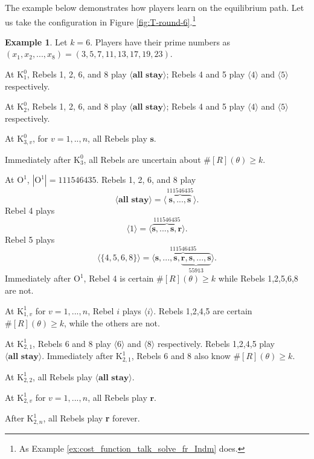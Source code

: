 \documentclass[12pt,letter]{article}
\newcommand{\Kappa}{\mathrm{K}}
\newcommand{\Omicron}{\mathrm{O}}
\theoremstyle{definition}
\newtheorem{example}{Example}
\theoremstyle{remark}
\theoremstyle{claim}
\begin{document}
The example below demonstrates how players learn on the equilibrium path. Let us take the configuration in Figure \ref{fig:T-round-6}.\footnote{As Example \ref{ex:cost_function_talk_solve_fr_Indm} does.}
\begin{example}
Let $k=6$. Players have their prime numbers as $(x_1,x_2,...,x_8)=(3,5,7,11,13,17,19,23)$.

At $\Kappa^0_{1}$, Rebels 1, 2, 6, and 8 play $\langle \textbf{all stay} \rangle$; Rebels 4 and 5 play $\langle 4 \rangle$ and $\langle 5 \rangle$ respectively. 

At $\Kappa^0_{2}$, Rebels 1, 2, 6, and 8 play $\langle \textbf{all stay} \rangle$; Rebels 4 and 5 play $\langle 4 \rangle$ and $\langle 5 \rangle$ respectively.

At $\Kappa^0_{3,v}$, for $v=1,..,n$, all Rebels play $\textbf{s} $. 

Immediately after $\Kappa^0_{3}$, all Rebels are uncertain about $\# [R](\theta)\geq k$.

At $\Omicron^1$, $|\Omicron^1|=111546435$. Rebels 1, 2, 6, and 8 play 
\[\langle \textbf{all stay} \rangle=\langle \overbrace{\textbf{s},...,\textbf{s}}^{111546435} \rangle.\] Rebel 4 plays 
\[\langle 1 \rangle=\langle \overbrace{\textbf{s},...,\textbf{s},\textbf{r}}^{111546435} \rangle.\] Rebel 5 plays 
\[\langle \{4,5,6,8\} \rangle=\langle \overbrace{\textbf{s},...,\textbf{s},\underbrace{\textbf{r},\textbf{s},...,\textbf{s}}_{55913}}^{111546435} \rangle.\] Immediately after $\Omicron^1$, Rebel 4 is certain $\# [R](\theta)\geq k$ while Rebels 1,2,5,6,8 are not.

At $\Kappa^1_{1,v}$ for $v=1,...,n$, Rebel $i$ plays $\langle i \rangle$. Rebels 1,2,4,5 are certain $\# [R](\theta)\geq k$, while the others are not.

At $\Kappa^1_{2,1}$, Rebels 6 and 8 play $\langle 6 \rangle$ and $\langle 8 \rangle$ respectively. Rebels 1,2,4,5 play $\langle \textbf{all stay} \rangle$. Immediately after $\Kappa^1_{2,1}$, Rebels 6 and 8 also know $\# [R](\theta)\geq k$.

At $\Kappa^1_{2,2}$, all Rebels play $\langle \textbf{all stay} \rangle$.

At $\Kappa^1_{2,v}$ for $v=1,...,n$, all Rebels play $\textbf{r}$. 

After $\Kappa^1_{2,n}$, all Rebels play \textbf{r} forever. 



\end{example}
\end{document}
